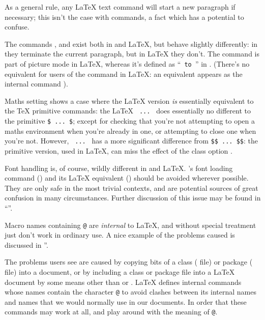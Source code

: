 As a general rule, any \LaTeX{} text command will start a new
paragraph if necessary; this isn't the case with \plaintex{}
commands, a fact which has a potential to confuse.

The commands ,  and  exist both
in \plaintex{} and \LaTeX{}, but behave slightly differently: in
\plaintex{} they terminate the current paragraph, but in \LaTeX{} they 
don't.  The command  is part of picture mode in \LaTeX{},
whereas it's defined as ``\texttt{ to }'' in
\plaintex{}. (There's no equivalent for users of the \plaintex{} command in
\LaTeX{}: an equivalent appears as the internal command ).

Maths setting shows a case where the \LaTeX{} version \emph{is}
essentially equivalent to the \TeX{} primitive commands: the \LaTeX{}
\csx{(}\texttt{\ ...\ }\csx{)} does essentially no different to the
primitive \texttt{\$\ ...\ \$}; except for checking that you're not
attempting to open a maths environment when you're already in one, or 
attempting to close one when you're not.
However, \csx{[}\texttt{\ ...\ }\csx{]} has a more significant
difference from \texttt{\$\$\ ...\ \$\$}: the primitive version, used
in \LaTeX{}, can miss the effect of the class option .

Font handling is, of course, wildly different in \plaintex{} and
\LaTeX{}.  \plaintex{}'s font loading command
() and its \LaTeX{} equivalent
() should be avoided wherever possible.  They are only
safe in the most trivial contexts, and are potential sources of great
confusion in many circumstances.   Further discussion of this issue
may be found in ``''.


Macro names containing \texttt{@} are \emph{internal} to \LaTeX{}, and
without special treatment just don't work in ordinary use.  A nice
example of the problems caused is discussed in %
''.

The problems users see are caused by copying bits of a class
( file) or 
package ( file) into a document, or by including a class or
package file into a \LaTeX{} document by some means other than
 or .  \LaTeX{} defines internal
commands whose names contain the character \texttt{@} to
avoid clashes between its internal names and names that we would
normally use in our documents.  In order that these commands may work
at all,  and  play around with the
meaning of \texttt{@}.

